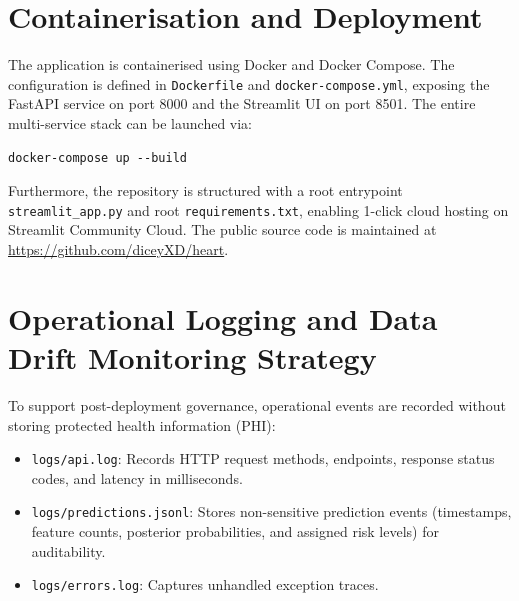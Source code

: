 \documentclass[12pt,a4paper]{report}
\begin{document}
\section{Containerisation and Deployment}

The application is containerised using Docker and Docker Compose. The configuration is defined in \texttt{Dockerfile} and \texttt{docker-compose.yml}, exposing the FastAPI service on port 8000 and the Streamlit UI on port 8501. The entire multi-service stack can be launched via:
\begin{verbatim}
docker-compose up --build
\end{verbatim}
Furthermore, the repository is structured with a root entrypoint \texttt{streamlit\_app.py} and root \texttt{requirements.txt}, enabling 1-click cloud hosting on Streamlit Community Cloud. The public source code is maintained at \url{https://github.com/diceyXD/heart}.

\section{Operational Logging and Data Drift Monitoring Strategy}

To support post-deployment governance, operational events are recorded without storing protected health information (PHI):
\begin{itemize}
\item \texttt{logs/api.log}: Records HTTP request methods, endpoints, response status codes, and latency in milliseconds.
\item \texttt{logs/predictions.jsonl}: Stores non-sensitive prediction events (timestamps, feature counts, posterior probabilities, and assigned risk levels) for auditability.
\item \texttt{logs/errors.log}: Captures unhandled exception traces.
\end{itemize}

\begin{table}[!htbp]
\centering
\caption{Data drift and model maintenance monitoring plan}
\label{tab:monitoring_plan}
\end{table}
\end{document}
